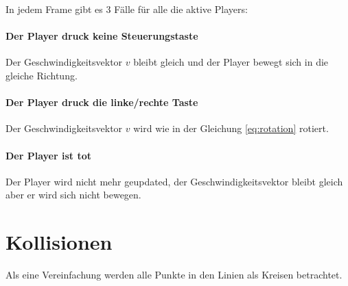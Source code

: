 \documentclass[doktyp=studarbeit]{TUBAFarbeiten}
\begin{document}
In jedem Frame gibt es 3 Fälle für alle die aktive Players:

\paragraph{Der Player druck keine Steuerungstaste}
Der Geschwindigkeitsvektor $v$ bleibt gleich und der Player bewegt sich
in die gleiche Richtung.

\paragraph{Der Player druck die linke/rechte Taste}
Der Geschwindigkeitsvektor $v$ wird wie in der Gleichung \ref{eq:rotation}
rotiert.

\paragraph{Der Player ist tot}
Der Player wird nicht mehr geupdated, der Geschwindigkeitsvektor bleibt gleich
aber er wird sich nicht bewegen.

\section{Kollisionen}

Als eine Vereinfachung werden alle Punkte in den Linien als Kreisen betrachtet.
\end{document}

